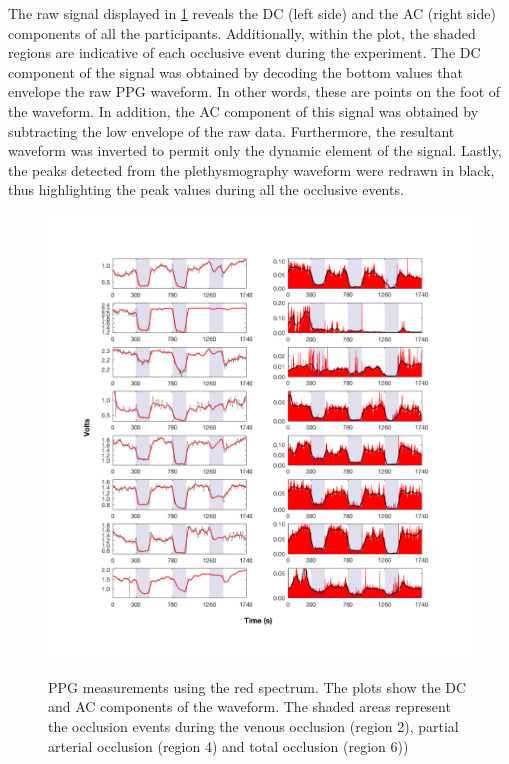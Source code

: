 The raw signal displayed in \ref{fig:RED PPG} reveals the DC (left side) and the AC (right side) components of all the participants. Additionally, within the plot, the shaded regions are indicative of each occlusive event during the experiment. The DC component of the signal was obtained by decoding the bottom values that envelope the raw PPG waveform. In other words, these are points on the foot of the waveform.  In addition, the AC component of this signal was obtained by subtracting the low envelope of the raw data. Furthermore, the resultant waveform was inverted to permit only the dynamic element of the signal. Lastly, the peaks detected from the plethysmography waveform were redrawn in black, thus highlighting the peak values during all the occlusive events.

\begin{figure}[!htbp]
	\centering
	\includegraphics[width=\textwidth,keepaspectratio,trim={1cm 0cm 0cm 0 cm},clip]{figure_cmp_4}
	\centering
	\begin{minipage}[t]{.45\linewidth}
		\centering
		\label{fig:RED PPG AC}
	\end{minipage}%
	\centering
	\begin{minipage}[t]{.45\linewidth}
		\centering
		\label{fig:RED PPG DC}
	\end{minipage}
	\caption[PPG red wavelength measurments, AC and DC components]{PPG measurements using the red spectrum. The plots show the DC and AC components of the waveform. The shaded areas represent the occlusion events during the venous occlusion (region 2), partial arterial occlusion (region 4) and total occlusion (region 6))}
	\label{fig:RED PPG}
\end{figure}

